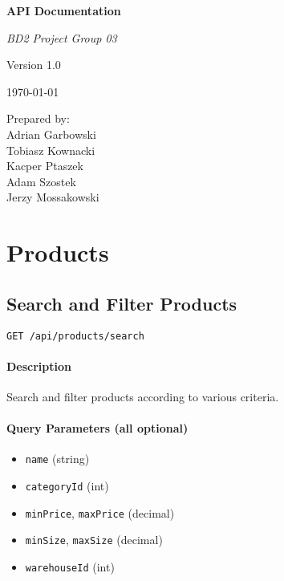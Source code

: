 \documentclass[a4paper,11pt]{article}
\begin{document}
\begin{titlepage}
  \centering

  {\Huge\bfseries API Documentation\par}
  \vspace{1.5cm}

  {\Large\itshape BD2 Project Group 03\par}
  \vspace{2cm}

  {\large Version 1.0\par}
  \vspace{1cm}

  {\large \today\par}

  \vfill

  {\small Prepared by: \\
    Adrian Garbowski \\
    Tobiasz Kownacki \\
    Kacper Ptaszek \\
    Adam Szostek \\
    Jerzy Mossakowski
  \par}
\end{titlepage}

\setcounter{tocdepth}{2}                  %
\tableofcontents
\bigskip

\section{Products}
\label{sec:products}

\subsection{Search and Filter Products}
\label{sec:products-search}
\begin{verbatim}
GET /api/products/search
\end{verbatim}
\paragraph{Description}
Search and filter products according to various criteria.
\paragraph{Query Parameters (all optional)}
\begin{itemize}
  \item \texttt{name} (string)
  \item \texttt{categoryId} (int)
  \item \texttt{minPrice}, \texttt{maxPrice} (decimal)
  \item \texttt{minSize}, \texttt{maxSize} (decimal)
  \item \texttt{warehouseId} (int)
\end{itemize}
\end{document}
